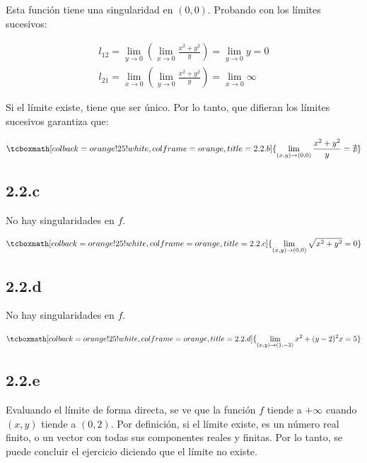\documentclass{article}
\begin{document}
Esta función tiene una singularidad en $(0, 0)$. Probando con los límites sucesivos:

\begin{align}
l_{12} = \lim_{y \rightarrow 0} \left( \lim_{x \rightarrow 0} \frac{x^2 + y^2}{y} \right) = \lim_{y \rightarrow 0} y = 0 \\
l_{21} = \lim_{x \rightarrow 0} \left( \lim_{y \rightarrow 0} \frac{x^2 + y^2}{y} \right) = \lim_{x \rightarrow 0} \infty
\end{align}

Si el límite existe, tiene que ser único. Por lo tanto, que difieran los límites sucesivos garantiza que:

\begin{equation}
\tcboxmath[colback=orange!25!white,colframe=orange,title=2.2.b]
{ \lim_{(x,y) \rightarrow (0,0)} \frac{x^2 + y^2}{y} = \nexists }
\end{equation}

\subsection*{2.2.c}
\label{subsec:2.2.c}

No hay singularidades en $f$.

\begin{equation}
\tcboxmath[colback=orange!25!white,colframe=orange,title=2.2.c]
{ \lim_{(x,y) \rightarrow (0,0)} \sqrt{x^2 + y^2} = 0 }
\end{equation}

\subsection*{2.2.d}
\label{subsec:2.2.d}

No hay singularidades en $f$.

\begin{equation}
\tcboxmath[colback=orange!25!white,colframe=orange,title=2.2.d]
{ \lim_{(x,y) \rightarrow (1,-2)} x^2 + (y-2)^2 x = 5 }
\end{equation}

\subsection*{2.2.e}
\label{subsec:2.2.e}

Evaluando el límite de forma directa, se ve que la función $f$ tiende a $+\infty$ cuando $(x,y)$ tiende a $(0,2)$. Por definición, si el límite existe, es un número real finito, o un vector con todas sus componentes reales y finitas. Por lo tanto, se puede concluir el ejercicio diciendo que el límite no existe.
\end{document}
